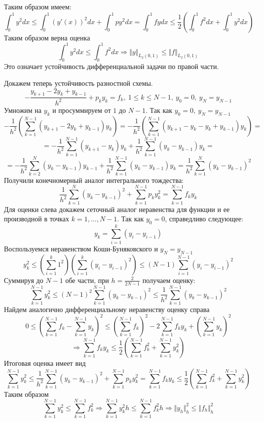 \documentclass[12pt]{article}
\begin{document}
\begin{enumerate}[I.]
	      Таким образом имеем:
	      \[\int_0^1y^2dx\leq\int_0^1 (y'(x))^2dx+ \int_0^1py^2 dx = \int_0^1fydx\leq\frac{1}{2}\left(\int_0^1f^2dx + \int_0^1y^2dx\right)\]
	      Таким образом верна оценка
	      \[\int_0^1y^2dx\leq\int_0^1f^2dx\Rightarrow\Vert y\Vert_{L_2(0,1)}\leq\Vert f\Vert_{L_2(0,1)}\]
	      Это означает устойчивость дифференциальной задачи по правой части.

	      Докажем теперь устойчивость разностной схемы.
	      \[-\frac{y_{k+1}-2y_k+y_{k-1}}{h^2}+p_ky_k = f_k,\ 1 \leq k \leq N-1,\ y_0 = 0,\ y_N = y_{N-1}\]
	      Умножим на $y_k$ и просуммируем от $1$ до $N-1$. Так как $y_0 = 0,\ y_N = y_{N-1}$
	      \[-\frac{1}{h^2}\left(\sum_{k=1}^{N-1}\left(y_{k+1}-2y_k+y_{k-1}\right)y_k\right)=-\frac{1}{h^2}\left(\sum_{k=1}^{N-1}\left(y_{k+1}-y_k-y_k+y_{k-1}\right)y_k\right)=\]
	      \[=-\frac{1}{h^2}\sum_{k=1}^{N-1}\left(y_{k+1}-y_k\right)y_k+\frac{1}{h^2}\sum_{k=1}^{N-1}\left(y_k-y_{k-1}\right)y_k=\]
	      \[=-\frac{1}{h^2}\sum_{k=2}^{N}\left(y_{k}-y_{k-1}\right)y_{k-1}+\frac{1}{h^2}\sum_{k=1}^{N-1}\left(y_k-y_{k-1}\right)y_k=\frac{1}{h^2}\sum_{k=1}^{N}(y_k-y_{k-1})^2\]
	      Получили конечномерный аналог интегрального тождества:
	      \[\frac{1}{h^2}\sum_{k=1}^N(y_k-y_{k-1})^2+\sum_{k=1}^{N-1}p_ky_k^2=\sum_{k=1}^{N-1}f_ky_k\]
	      Для оценки слева докажем сеточный аналог неравенства для функции и ее производной в точках $k=1,...,N-1$.
	      Так как $y_0 = 0$, справедливо следующее:
	      \[y_k=\sum_{i=1}^{k}(y_i-y_{i-1})\]
	      Воспользуемся неравенством Коши-Буняковского и $y_N=y_{N-1}$
	      \[y_k^2\leq\left(\sum_{i=1}^k1^2\right)\left(\sum_{i=1}^k(y_i-y_{i-1})^2\right)\leq (N-1)\sum_{i=1}^{N-1}(y_i-y_{i-1})^2\]
	      Суммируя до $N-1$ обе части, при $h=\frac{2}{2N-1}$ получаем оценку:
	      \[\sum_{k=1}^{N-1}y_k^2\leq(N-1)^2\sum_{k=1}^{N-1}(y_k-y_{k-1})^2\leq\frac{1}{h^2}\sum_{k=1}^{N-1}(y_k-y_{k-1})^2\]
	      Найдем аналогично дифференциальному неравенству оценку справа
	      \[0\leq\left(\sum_{k=1}^{N-1}f_k-\sum_{k=1}^{N-1}y_k\right)^2\leq\left(\sum_{k=1}^{N-1}f_k\right)^2-2\sum_{k=1}^{N-1}f_ky_k+\left(\sum_{k=1}^{N-1}y_k\right)^2\]
	      \[\Rightarrow\sum_{k=1}^{N-1}f_ky_k\leq\frac{1}{2}\left(\sum_{k=1}^{N-1}f_k^2+\sum_{k=1}^{N-1}y_k^2\right)\]
	      Итоговая оценка имеет вид
	      \[\sum_{k=1}^{N-1}y_k^2\leq\frac{1}{h^2}\sum_{k=1}^{N-1}(y_k-y_{k-1})^2+\sum_{k=1}^{N-1}p_ky_k^2=\sum_{k=1}^{N-1}f_ky_k\leq\frac{1}{2}\left(\sum_{k=1}^{N-1}f_k^2+\sum_{k=1}^{N-1}y_k^2\right)\]
	      Таким образом
	      \[\sum_{k=1}^{N-1}y_k^2\leq\sum_{k=1}^{N-1}f_k^2\Rightarrow\sum_{k=1}^{N-1}y_k^2h\leq\sum_{k=1}^{N-1}f_k^2h\Rightarrow\Vert y_h\Vert^2_h\leq\Vert f_h\Vert^2_h\]

\end{enumerate}
\end{document}
